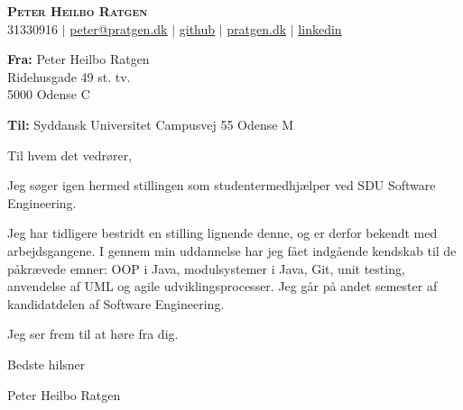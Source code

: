 \documentclass{article}
\begin{document}
\begin{center}
  \textbf{\huge{\scshape{Peter Heilbo Ratgen}}}\\ 
  \vspace{0.2cm}
  \small 31330916 $|$
  \href{mailto:peter@pratgen.dk}{\underline{peter@pratgen.dk}} $|$
  \href{https://github.com/PeterRatgen }{\underline{github}} $|$
  \href{https://pratgen.dk}{\underline{pratgen.dk}} $|$
  \href{https://www.linkedin.com/in/peter-ratgen-a1236529/}{\underline{linkedin}}
\end{center}
\vspace{0.25cm}
\begin{flushright}
\begin{minipage}{.40\linewidth}
    \begin{flushleft}
    \textbf{Fra: }\newline
    Peter Heilbo Ratgen \\
    Ridehusgade 49 st. tv. \\
    5000 Odense C
    \end{flushleft}
\end{minipage}
\end{flushright}
\begin{flushleft}
\textbf{Til:}\newline
Syddansk Universitet \newline
Campusvej 55  Odense M
\end{flushleft}
\vspace{0.5cm}

Til hvem det vedrører, \vspace{\baselineskip}

Jeg søger igen hermed stillingen som studentermedhjælper ved SDU Software
Engineering. \vspace{\baselineskip}

Jeg har tidligere bestridt en stilling lignende denne, og er derfor bekendt med
arbejdsgangene. I gennem min uddannelse har jeg fået indgående kendskab til de
påkrævede emner: OOP i Java, modulsystemer i Java, Git, unit testing, anvendelse
af UML og agile udviklingsprocesser. Jeg går på andet semester af kandidatdelen
af Software Engineering. \vspace{\baselineskip}

Jeg ser frem til at høre fra dig. \vspace{\baselineskip}

\begin{flushleft}
Bedste hilsner

\vspace{\baselineskip} Peter Heilbo Ratgen
\end{flushleft}
\end{document}
